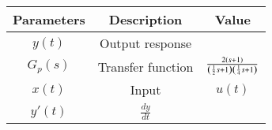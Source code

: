\begin{tabular}{|c|c|c|}
\hline
\textbf{Parameters} & \textbf{Description} & \textbf{Value} \\
\hline
$y(t)$ & Output response & \\
\hline
$G_p(s)$ & Transfer function & $\frac{2\left(s+1\right)}{\left(\frac{1}{2}s+1\right)\left(\frac{1}{4}s+1\right)}$\\
\hline
$x(t)$ & Input & $u(t)$ \\
\hline
$y'(t)$ & $\frac{dy}{dt}$ &  \\
\hline
\end{tabular}
